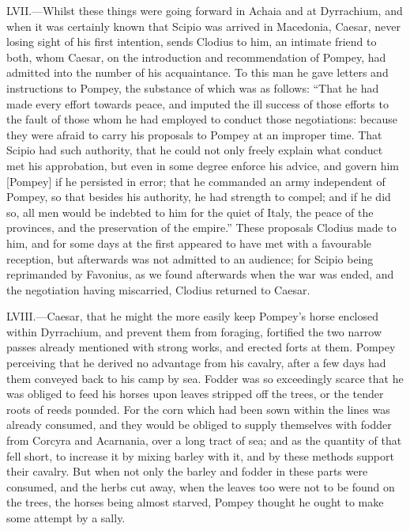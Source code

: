 LVII.—Whilst these things were going forward in Achaia and at
Dyrrachium, and when it was certainly known that Scipio was arrived in
Macedonia, Caesar, never losing sight of his first intention, sends
Clodius to him, an intimate friend to both, whom Caesar, on the
introduction and recommendation of Pompey, had admitted into the number
of his acquaintance. To this man he gave letters and instructions to
Pompey, the substance of which was as follows: ``That he had made every
effort towards peace, and imputed the ill success of those efforts to
the fault of those whom he had employed to conduct those negotiations:
because they were afraid to carry his proposals to Pompey at an improper
time. That Scipio had such authority, that he could not only freely
explain what conduct met his approbation, but even in some degree
enforce his advice, and govern him [Pompey] if he persisted in error;
that he commanded an army independent of Pompey, so that besides his
authority, he had strength to compel; and if he did so, all men would be
indebted to him for the quiet of Italy, the peace of the provinces, and
the preservation of the empire.'' These proposals Clodius made to him,
and for some days at the first appeared to have met with a favourable
reception, but afterwards was not admitted to an audience; for Scipio
being reprimanded by Favonius, as we found afterwards when the war was
ended, and the negotiation having miscarried, Clodius returned to
Caesar.

LVIII.—Caesar, that he might the more easily keep Pompey's horse
enclosed within Dyrrachium, and prevent them from foraging, fortified
the two narrow passes already mentioned with strong works, and erected
forts at them. Pompey perceiving that he derived no advantage from his
cavalry, after a few days had them conveyed back to his camp by sea.
Fodder was so exceedingly scarce that he was obliged to feed his horses
upon leaves stripped off the trees, or the tender roots of reeds
pounded. For the corn which had been sown within the lines was already
consumed, and they would be obliged to supply themselves with fodder
from Corcyra and Acarnania, over a long tract of sea; and as the
quantity of that fell short, to increase it by mixing barley with it,
and by these methods support their cavalry. But when not only the barley
and fodder in these parts were consumed, and the herbs cut away, when
the leaves too were not to be found on the trees, the horses being
almost starved, Pompey thought he ought to make some attempt by a sally.

